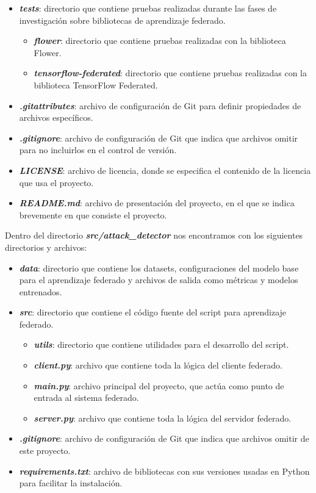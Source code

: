 \begin{itemize}
    \item \textit{\textbf{tests}}: directorio que contiene pruebas realizadas durante las fases de investigación sobre bibliotecas de aprendizaje federado.
    \begin{itemize}
        \item \textit{\textbf{flower}}: directorio que contiene pruebas realizadas con la biblioteca Flower.
        \item \textit{\textbf{tensorflow-federated}}: directorio que contiene pruebas realizadas con la biblioteca TensorFlow Federated.
    \end{itemize}
    \item \textit{\textbf{.gitattributes}}: archivo de configuración de Git para definir propiedades de archivos específicos.
    \item \textit{\textbf{.gitignore}}: archivo de configuración de Git que indica que archivos omitir para no incluirlos en el control de versión.
    \item \textit{\textbf{LICENSE}}: archivo de licencia, donde se especifica el contenido de la licencia que usa el proyecto. 
    \item \textit{\textbf{README.md}}: archivo de presentación del proyecto, en el que se indica brevemente en que consiste el proyecto.
\end{itemize}

Dentro del directorio \textit{\textbf{src/attack\_detector}} nos encontramos con los siguientes directorios y archivos:
\begin{itemize}
    \item \textit{\textbf{data}}: directorio que contiene los datasets, configuraciones del modelo base para el aprendizaje federado y archivos de salida como métricas y modelos entrenados.
    \item \textit{\textbf{src}}: directorio que contiene el código fuente del script para aprendizaje federado.
     \begin{itemize}
        \item \textit{\textbf{utils}}: directorio que contiene utilidades para el desarrollo del script.
        \item \textit{\textbf{client.py}}: archivo que contiene toda la lógica del cliente federado.
        \item \textit{\textbf{main.py}}: archivo principal del proyecto, que actúa como punto de entrada al sistema federado.
        \item \textit{\textbf{server.py}}: archivo que contiene toda la lógica del servidor federado.
    \end{itemize}
    \item \textit{\textbf{.gitignore}}: archivo de configuración de Git que indica que archivos omitir de este proyecto.
    \item \textit{\textbf{requirements.txt}}: archivo de bibliotecas con sus versiones usadas en Python para facilitar la instalación.
\end{itemize}

